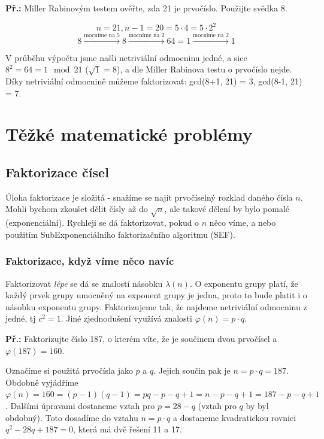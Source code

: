 \begin{exercise}
\textbf{Př.:} Miller Rabinovým testem ověřte, zda 21 je prvočíslo. Použijte
svědka 8.

$$n = 21, n-1 = 20 = 5 \cdot 4  = 5 \cdot 2^2$$
$$ 8 \xrightarrow{\text{mocníme na 5}} 8 \xrightarrow{\text{mocníme na 2}} 64 =
1 \xrightarrow{\text{mocníme na 2}} 1$$

V průběhu výpočtu jsme našli netriviální odmocninu jedné, a sice $8^2 = 64 = 1
\mod 21$ ($\sqrt{1} = 8$), a dle Miller Rabinova testu o prvočíslo nejde. Díky
netriviální odmocnině můžeme faktorizovat: gcd(8+1, 21) = 3, gcd(8-1, 21) = 7.
\end{exercise}


\section{Těžké matematické problémy}
\subsection{Faktorizace čísel}
Úloha faktorizace je složitá - snažíme se najít prvočíselný rozklad daného čísla
$n$. Mohli bychom zkoušet dělit čísly až do $\sqrt{n}$, ale takové dělení by
bylo pomalé (exponenciální). Rychleji se dá faktorizovat, pokud o $n$ něco víme,
a nebo použitím SubExponenciálního faktorizačního algoritmu (SEF).

\subsubsection{Faktorizace, když víme něco navíc}

Faktorizovat \textit{lépe} se dá se znalostí násobku $\lambda(n)$. O exponentu grupy
platí, že každý prvek grupy umocněný na exponent grupy je jedna, proto to bude
platit i o násobku exponentu grupy. Faktorizujeme tak, že najdeme netriviální
odmocninu z jedné, tj $c^2 = 1$. Jiné zjednodušení využívá znalosti $\varphi(n)
= p \cdot q$.

\begin{exercise}
\textbf{Př.:} Faktorizujte číslo 187, o kterém víte, že je součinem dvou
prvočísel a $\varphi(187) = 160$.

Označíme si použitá prvočísla jako $p$ a $q$. Jejich součin pak je $n = p \cdot
q = 187$. Obdobně vyjádříme $\varphi(n) = 160 = (p-1)(q-1) = pq - p - q + 1 = n
- p - q + 1 = 187 - p - q + 1$. Dalšími úpravami dostaneme vztah pro $p = 28 -
q$ (vztah pro $q$ by byl obdobný). Toto dosadíme do vztahu $n = p\cdot q$ a
dostaneme kvadratickou rovnici $q^2 - 28q + 187 = 0$, která má dvě řešení 11 a
17.
\end{exercise}

